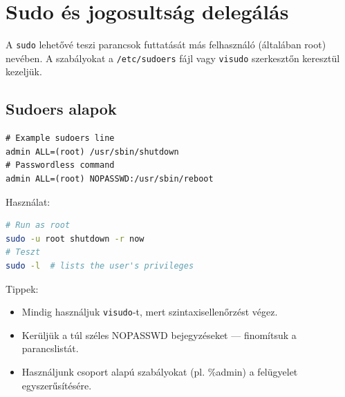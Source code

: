 \section{Sudo és jogosultság delegálás}

A \texttt{sudo} lehetővé teszi parancsok futtatását más felhasználó (általában root) nevében. A szabályokat a \texttt{/etc/sudoers} fájl vagy \texttt{visudo} szerkesztőn keresztül kezeljük.

\subsection{Sudoers alapok}
\begin{verbatim}
# Example sudoers line
admin ALL=(root) /usr/sbin/shutdown
# Passwordless command
admin ALL=(root) NOPASSWD:/usr/sbin/reboot
\end{verbatim}

Használat:
\begin{lstlisting}[language=bash]
# Run as root
sudo -u root shutdown -r now
# Teszt
sudo -l  # lists the user's privileges
\end{lstlisting}

Tippek:
\begin{itemize}
  \item Mindig használjuk \texttt{visudo}-t, mert szintaxisellenőrzést végez.
  \item Kerüljük a túl széles NOPASSWD bejegyzéseket — finomítsuk a parancslistát.
  \item Használjunk csoport alapú szabályokat (pl. \%admin) a felügyelet egyszerűsítésére.
\end{itemize}
